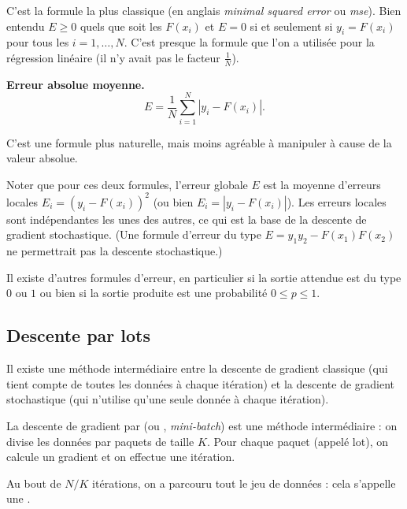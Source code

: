 \documentclass[10pt,class=report,crop=false]{standalone}
\begin{document}
C'est la formule la plus classique (en anglais \emph{minimal squared error} ou \emph{mse}). 
Bien entendu $E\ge0$ quels que soit les $F(x_i)$ et $E=0$ si et seulement si $y_i=F(x_i)$ pour tous les $i=1,\ldots,N$. 
C'est presque la formule que l'on a utilisée pour la régression linéaire (il n'y avait pas le facteur $\frac1N$).

\textbf{Erreur absolue moyenne.}
$$E = \frac{1}{N} \sum_{i=1}^N |y_i-F(x_i)|.$$

C'est une formule plus naturelle, mais moins agréable à manipuler à cause de la valeur absolue.

Noter que pour ces deux formules, l'erreur globale $E$ est la moyenne d'erreurs locales $E_i = (y_i-F(x_i))^2$ (ou bien $E_i = |y_i-F(x_i)|$).
Les erreurs locales sont indépendantes les unes des autres, ce qui est la base de la descente de gradient stochastique.
(Une formule d'erreur du type $E = y_1y_2 - F(x_1)F(x_2)$ ne permettrait pas la descente stochastique.)

Il existe d'autres formules d'erreur, en particulier si la sortie attendue est du type $0$ ou $1$ ou bien si la sortie produite est une probabilité $0\le p \le 1$. 


\subsection{Descente par lots}
\label{ssec:lot}


Il existe une méthode intermédiaire entre la descente de gradient classique (qui tient compte de toutes les données à chaque itération)
et la descente de gradient stochastique (qui n'utilise qu'une seule donnée à chaque itération).

La descente de gradient par  (ou , \emph{mini-batch}) est une méthode intermédiaire : on divise les données par paquets de taille $K$. Pour chaque paquet (appelé \og{}lot\fg{}), on calcule un gradient et on effectue une itération.

Au bout de $N/K$ itérations, on a parcouru tout le jeu de données : cela s'appelle une .


\end{document}
